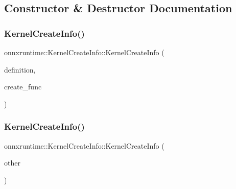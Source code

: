 \subsection{Constructor \& Destructor Documentation}
\mbox{\label{structonnxruntime_1_1KernelCreateInfo_a0e38874795b76fbdef0606c051f43fa7}} 
\subsubsection{\texorpdfstring{Kernel\+Create\+Info()}{KernelCreateInfo()}\hspace{0.1cm}{\footnotesize\ttfamily [1/2]}}
{\footnotesize\ttfamily onnxruntime\+::\+Kernel\+Create\+Info\+::\+Kernel\+Create\+Info (\begin{DoxyParamCaption}\item[{std\+::unique\+\_\+ptr$<$ \mbox{\hyperlink{classonnxruntime_1_1KernelDef}{Kernel\+Def}} $>$}]{definition,  }\item[{\mbox{\hyperlink{namespaceonnxruntime_a2e23731e78afbe4e5e15a18493162335}{Kernel\+Create\+Fn}}}]{create\+\_\+func }\end{DoxyParamCaption})\hspace{0.3cm}{\ttfamily [inline]}}

\mbox{\label{structonnxruntime_1_1KernelCreateInfo_adecf1b55966f673e60599b2c2a8b50bb}} 
\subsubsection{\texorpdfstring{Kernel\+Create\+Info()}{KernelCreateInfo()}\hspace{0.1cm}{\footnotesize\ttfamily [2/2]}}
{\footnotesize\ttfamily onnxruntime\+::\+Kernel\+Create\+Info\+::\+Kernel\+Create\+Info (\begin{DoxyParamCaption}\item[{\mbox{\hyperlink{structonnxruntime_1_1KernelCreateInfo}{Kernel\+Create\+Info}} \&\&}]{other }\end{DoxyParamCaption})\hspace{0.3cm}{\ttfamily [inline]}}



